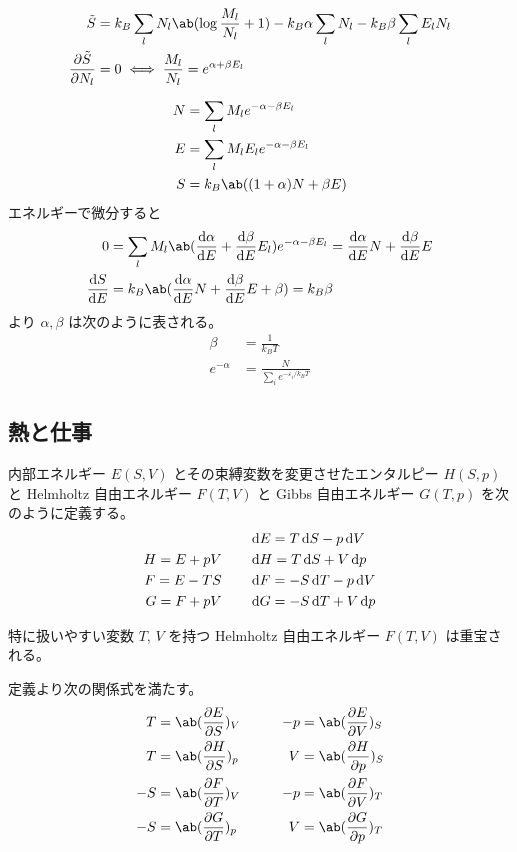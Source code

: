 \documentclass[a4paper,11pt]{jlreq}
\begin{document}
\begin{align}
  \tilde{S}              & = k_B\sum_{l}N_l\ab(\log\frac{M_l}{N_l} + 1) - k_B\alpha\sum_{l}N_l - k_B\beta\sum_{l}E_lN_l \\
  \diffp{\tilde{S}}{N_l} & = 0 \iff \frac{M_l}{N_l} = e^{\alpha + \beta E_l}
\end{align}

\begin{align}
  N & = \sum_{l}M_le^{-\alpha-\beta E_l}    \\
  E & = \sum_{l}M_lE_le^{-\alpha-\beta E_l} \\
  S & = k_B\ab((1 + \alpha)N + \beta E)
\end{align}
エネルギーで微分すると
\begin{align}
  0           & = \sum_{l}M_l\ab(\diff{\alpha}{E} + \diff{\beta}{E}E_l)e^{-\alpha-\beta E_l} = \diff{\alpha}{E}N + \diff{\beta}{E}E \\
  \diff{S}{E} & = k_B\ab(\diff{\alpha}{E}N + \diff{\beta}{E}E + \beta) = k_B\beta
\end{align}
より $\alpha, \beta$ は次のように表される。
\begin{align}
  \beta       & = \frac{1}{k_BT}                            \\
  e^{-\alpha} & = \frac{N}{\sum_{i}e^{-\varepsilon_i/k_BT}}
\end{align}


\subsection{熱と仕事}
\begin{definition}
  内部エネルギー $E(S, V)$ とその束縛変数を変更させたエンタルピー $H(S, p)$ と Helmholtz 自由エネルギー $F(T, V)$ と Gibbs 自由エネルギー $G(T, p)$ を次のように定義する。
  \begin{align}
               & \qquad \dl{E} = T\dl{S} - p\dl{V}  \\
    H = E + pV & \qquad \dl{H} = T\dl{S} + V\dl{p}  \\
    F = E - TS & \qquad \dl{F} = -S\dl{T} - p\dl{V} \\
    G = F + pV & \qquad \dl{G} = -S\dl{T} + V\dl{p}
  \end{align}
\end{definition}
特に扱いやすい変数 $T$, $V$ を持つ Helmholtz 自由エネルギー $F(T, V)$ は重宝される。
\begin{theorem}
  定義より次の関係式を満たす。
  \begin{alignat}{3}
    T  & = \ab(\diffp{E}{S})_V & \qquad -p & = \ab(\diffp{E}{V})_S \\
    T  & = \ab(\diffp{H}{S})_p & \qquad V  & = \ab(\diffp{H}{p})_S \\
    -S & = \ab(\diffp{F}{T})_V & \qquad -p & = \ab(\diffp{F}{V})_T \\
    -S & = \ab(\diffp{G}{T})_p & \qquad V  & = \ab(\diffp{G}{p})_T
  \end{alignat}
\end{theorem}
\end{document}
